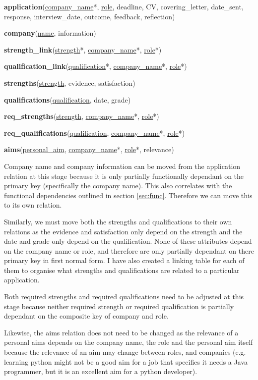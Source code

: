 \documentclass{article}
\begin{document}
\textbf{application}(\underline{company\_name}*, \underline{role}, deadline, CV, covering\_letter, date\_sent, response, interview\_date, outcome, feedback, reflection)

\textbf{company}(\underline{name}, information)

\textbf{strength\_link}(\underline{strength}*, \underline{company\_name}*, \underline{role}*)

\textbf{qualification\_link}(\underline{qualification}*, \underline{company\_name}*, \underline{role}*)

\textbf{strengths}(\underline{strength}, evidence, satisfaction)

\textbf{qualifications}(\underline{qualification}, date, grade)

\textbf{req\_strengths}(\underline{strength}, \underline{company\_name}*, \underline{role}*)

\textbf{req\_qualifications}(\underline{qualification}, \underline{company\_name}*, \underline{role}*)

\textbf{aims}(\underline{personal\_aim}, \underline{company\_name}*, \underline{role}*, relevance)

Company name and company information can be moved from the application relation at this stage because it is only partially functionally dependant on the primary key (specifically the company name). This also correlates with the functional dependencies outlined in section \ref{sec:func}. Therefore we can move this to its own relation.

Similarly, we must move both the strengths and qualifications to their own relations as the evidence and satisfaction only depend on the strength and the date and grade only depend on the qualification. None of these attributes depend on the company name or role, and therefore are only partially dependant on there primary key in first normal form. I have also created a linking table for each of them to organise what strengths and qualifications are related to a particular application.

Both required strengths and required qualifications need to be adjusted at this stage because neither required strength or required qualification is partially dependant on the composite key of company and role. 

Likewise, the aims relation does not need to be changed as the relevance of a personal aims depends on the company name, the role and the personal aim itself because the relevance of an aim may change between roles, and companies (e.g. learning python might not be a good aim for a job that specifies it needs a Java programmer, but it is an excellent aim for a python developer).
\end{document}
